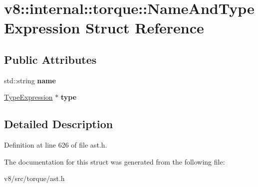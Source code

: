 \hypertarget{structv8_1_1internal_1_1torque_1_1NameAndTypeExpression}{}\section{v8\+:\+:internal\+:\+:torque\+:\+:Name\+And\+Type\+Expression Struct Reference}
\label{structv8_1_1internal_1_1torque_1_1NameAndTypeExpression}
\subsection*{Public Attributes}
\begin{DoxyCompactItemize}
\item 
\mbox{\label{structv8_1_1internal_1_1torque_1_1NameAndTypeExpression_a4e26c00aaef20aab0f9190c4bb7470ee}} 
std\+::string {\bfseries name}
\item 
\mbox{\label{structv8_1_1internal_1_1torque_1_1NameAndTypeExpression_a2f76e342a23ab8a72e376e8639dc61cd}} 
\mbox{\hyperlink{structv8_1_1internal_1_1torque_1_1TypeExpression}{Type\+Expression}} $\ast$ {\bfseries type}
\end{DoxyCompactItemize}


\subsection{Detailed Description}


Definition at line 626 of file ast.\+h.



The documentation for this struct was generated from the following file\+:\begin{DoxyCompactItemize}
\item 
v8/src/torque/ast.\+h\end{DoxyCompactItemize}
